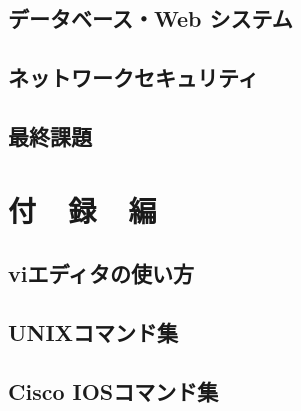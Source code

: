 \documentclass[10pt]{text2002}
\begin{document}
\chapter{データベース・Web システム}


\chapter{ネットワークセキュリティ}


\chapter{最終課題}
\def\chapfinal{07_final/}


%


\part{付~~録~~編}\label{part:appendix}
\appendix
\chapter{viエディタの使い方}\label{etc:vi}


\chapter{UNIXコマンド集}\label{etc:unixcmd}

%
%
%
\chapter{Cisco IOSコマンド集}\label{etc:ioscmd}


%

%

%
\end{document}
